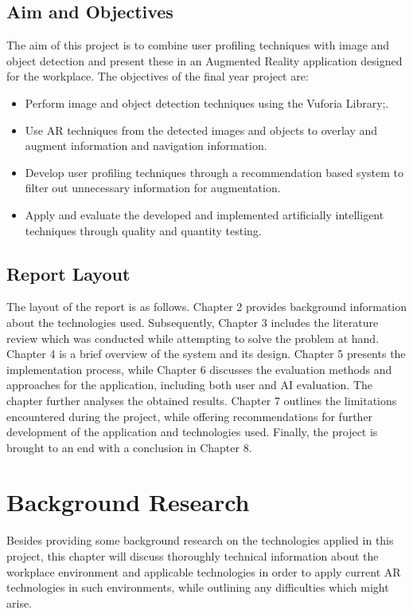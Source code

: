 \documentclass{aifyp}
\begin{document}
\subsection{Aim and Objectives}
The aim of this project is to combine user profiling techniques with image and object detection and present these in an Augmented Reality application designed for the workplace.
\newline
\newline
The objectives of the final year project are:
\begin{itemize}
    \item Perform image and object detection techniques using the Vuforia Library;.
    \item Use AR techniques from the detected images and objects to overlay and augment information and navigation information.
    \item Develop user profiling techniques through a recommendation based system to filter out unnecessary information for augmentation.
    \item Apply and evaluate the developed and implemented artificially intelligent techniques through quality and quantity testing.
\end{itemize}

\subsection{Report Layout}
\indent The layout of the report is as follows. Chapter 2 provides background information about the technologies used. Subsequently, Chapter 3 includes the literature review which was conducted while attempting to solve the problem at hand. Chapter 4 is a brief overview of the system and its design.  Chapter 5 presents the implementation process, while Chapter 6 discusses the evaluation methods and approaches for the application, including both user and AI evaluation. The chapter further analyses the obtained results. Chapter 7 outlines the limitations encountered during the project, while offering recommendations for further development of the application and technologies used. Finally, the project is brought to an end with a conclusion in Chapter 8.
\pagebreak
\section{Background Research}
Besides providing some background research on the technologies applied in this project, this chapter will discuss thoroughly technical information about the workplace environment and applicable technologies in order to apply current AR technologies in such environments, while outlining any difficulties which might arise.
\end{document}
